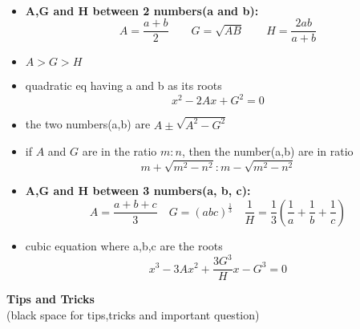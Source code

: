 \documentclass[11pt,a4paper,landscape]{article}
\begin{document}
\begin{multicols*}{3}
{\bfseries {}}\\
\begin{itemize}
	\item {\bfseries \noindent A,G and H between 2 numbers(a and b):}\\
	 	{$$A =\frac{a+b}{2} \qquad G =\sqrt{AB} \qquad H=\frac{2ab}{a+b}$$}

	\item $A>G>H$
	\item quadratic eq having a and b as its roots\\
		$$x^2 - 2Ax+G^2=0$$
	\item the two numbers(a,b) are $A\pm \sqrt{A^2 - G^2}$
	\item if $A$ and $G$ are in the ratio $m:n$,
		then the number(a,b) are in ratio$$m+\sqrt{m^2 - n^2} : m-\sqrt{m^2 - n^2}$$
	\item {\bfseries \noindent A,G and H between 3 numbers(a, b, c):}\\
		$$A=\frac{a+b+c}{3} \quad G=(abc)^{\frac{1}{3}} \quad \frac{1}{H}=\frac{1}{3}\left (\frac{1}{a}+\frac{1}{b}+				\frac{1}{c} \right ) $$
	\item cubic equation where a,b,c are the roots
		$$x^3-3Ax^2+\frac{3G^3}{H}x-G^3=0$$
\end{itemize}
\vfill\null
\columnbreak
{\bfseries {\huge Tips and Tricks}}\\
(black space for tips,tricks and important question) 

\end{multicols*}
\end{document}
